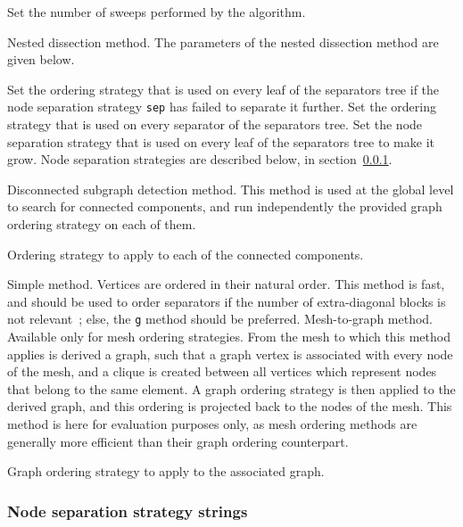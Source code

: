 \begin{itemize}
\begin{itemize}
\iteme[{\tt pass=}{\it nbr}]
Set the number of sweeps performed by the algorithm.
\end{itemize}
\iteme[{\tt n}]
Nested dissection method. The parameters of the nested dissection method are
given below.
\begin{itemize}
\iteme[{\tt ole=}{\it strat}]
Set the ordering strategy that is used on every leaf of the separators tree
if the node separation strategy {\tt sep} has failed to separate it further.
\iteme[{\tt ose=}{\it strat}]
Set the ordering strategy that is used on every separator of the separators
tree.
\iteme[{\tt sep=}{\it strat}]
Set the node separation strategy that is used on every leaf of the
separators tree to make it grow. Node separation strategies are
described below, in section~\ref{sec-lib-format-nsep}.
\end{itemize}
\iteme[{\tt o}]
Disconnected subgraph detection method. This method is used at the
global level to search for connected components, and run independently
the provided graph ordering strategy on each of them.
\begin{itemize}
\iteme[{\tt strat=}{\it strat}]
Ordering strategy to apply to each of the connected components.
\end{itemize}
\iteme[{\tt s}]
Simple method. Vertices are ordered in their natural order. This
method is fast, and should be used to order separators if the number
of extra-diagonal blocks is not relevant~; else, the {\tt g} method
should be preferred.
\iteme[{\tt v}]
Mesh-to-graph method. Available only for mesh ordering strategies.
From the mesh to which this method applies is derived a graph,
such that a graph vertex is associated with every node of the
mesh, and a clique is created between all vertices which represent
nodes that belong to the same element. A graph ordering strategy is
then applied to the derived graph, and this ordering is projected
back to the nodes of the mesh. This method is here for evaluation
purposes only, as mesh ordering methods are generally more
efficient than their graph ordering counterpart.
\begin{itemize}
\iteme[{\tt strat=}{\it strat}]
Graph ordering strategy to apply to the associated graph.
\end{itemize}
\end{itemize}

\subsubsection{Node separation strategy strings}
\label{sec-lib-format-nsep}

